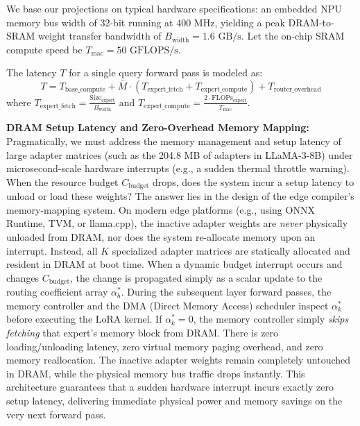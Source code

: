 \documentclass{article}
\theoremstyle{plain}
\theoremstyle{definition}
\theoremstyle{remark}
\begin{document}
We base our projections on typical hardware specifications: an embedded NPU memory bus width of 32-bit running at 400 MHz, yielding a peak DRAM-to-SRAM weight transfer bandwidth of $B_{\text{width}} = 1.6\text{ GB/s}$. Let the on-chip SRAM compute speed be $T_{\text{mac}} = 50\text{ GFLOPS/s}$.

The latency $T$ for a single query forward pass is modeled as:
\begin{equation}
T = T_{\text{base\_compute}} + \bar{M} \cdot \left( T_{\text{expert\_fetch}} + T_{\text{expert\_compute}} \right) + T_{\text{router\_overhead}}
\label{eq:app_latency_model}
\end{equation}
where $T_{\text{expert\_fetch}} = \frac{\text{Size}_{\text{expert}}}{B_{\text{width}}}$ and $T_{\text{expert\_compute}} = \frac{2 \cdot \text{FLOPs}_{\text{expert}}}{T_{\text{mac}}}$. 

\textbf{DRAM Setup Latency and Zero-Overhead Memory Mapping:} 
Pragmatically, we must address the memory management and setup latency of large adapter matrices (such as the 204.8 MB of adapters in LLaMA-3-8B) under microsecond-scale hardware interrupts (e.g., a sudden thermal throttle warning). When the resource budget $C_{\text{budget}}$ drops, does the system incur a setup latency to unload or load these weights? 
The answer lies in the design of the edge compiler's memory-mapping system. On modern edge platforms (e.g., using ONNX Runtime, TVM, or llama.cpp), the inactive adapter weights are \emph{never} physically unloaded from DRAM, nor does the system re-allocate memory upon an interrupt. Instead, all $K$ specialized adapter matrices are statically allocated and resident in DRAM at boot time.
When a dynamic budget interrupt occurs and changes $C_{\text{budget}}$, the change is propagated simply as a scalar update to the routing coefficient array $\alpha^*_b$. During the subsequent layer forward passes, the memory controller and the DMA (Direct Memory Access) scheduler inspect $\alpha^*_k$ before executing the LoRA kernel. If $\alpha^*_k = 0$, the memory controller simply \emph{skips fetching} that expert's memory block from DRAM. There is zero loading/unloading latency, zero virtual memory paging overhead, and zero memory reallocation. The inactive adapter weights remain completely untouched in DRAM, while the physical memory bus traffic drops instantly. This architecture guarantees that a sudden hardware interrupt incurs exactly zero setup latency, delivering immediate physical power and memory savings on the very next forward pass.
\end{document}
